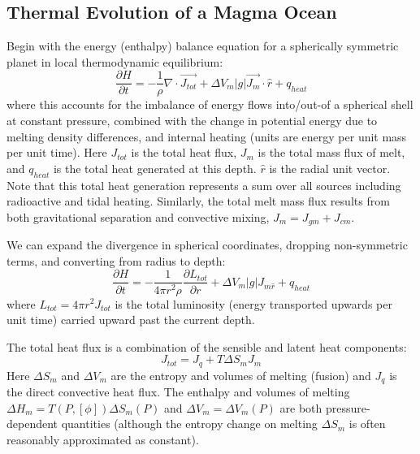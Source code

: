\subsection{Thermal Evolution of a Magma Ocean}
Begin with the energy (enthalpy) balance equation for a spherically symmetric planet in local thermodynamic equilibrium: 
\begin{equation}
  \frac{\partial H}{\partial t} = - \frac{1}{\rho}\nabla \cdot \vec{J_{tot}} + \Delta V_m|g|\vec{J_m} \cdot \hat{r} + q_{heat}
\end{equation}
where this accounts for the imbalance of energy flows into/out-of a spherical shell at constant pressure, combined with the change in potential energy due to melting density differences, and internal heating (units are energy per unit mass per unit time).
Here  $J_{tot}$ is the total heat flux, $J_m$ is the total mass flux of melt, and $q_{heat}$ is the total heat generated at this depth.  $\hat{r}$ is the radial unit vector.
Note that this total heat generation represents a sum over all sources including radioactive and tidal heating.
Similarly, the total melt mass flux results from both gravitational separation and convective mixing, ${J_m = J_{gm} + J_{cm}}$.

We can expand the divergence in spherical coordinates, dropping non-symmetric terms, and converting from radius to depth: 
\begin{equation}
  \frac{\partial H}{\partial t} = - \frac{1}{4\pi r^2 \rho} \frac{\partial L_{tot}}{\partial r} + \Delta V_m|g|J_{m\hat{r}} + q_{heat}
\end{equation}
where $L_{tot} = 4 \pi r^2 J_{tot}$ is the total luminosity (energy transported upwards per unit time) carried upward past the current depth. 


The total heat flux is a combination of the sensible and latent heat components:
\begin{equation}
  J_{tot} = J_q + T\Delta S_m J_m
\end{equation}
Here $\Delta S_m$ and $\Delta V_m$ are the entropy and volumes of melting (fusion) and $J_q$ is the direct convective heat flux.
The enthalpy and volumes of melting ${\Delta H_m = T(P, [\phi])\Delta S_m(P)}$ and ${\Delta V_m = \Delta V_m(P)}$ are both pressure-dependent quantities (although the entropy change on melting $\Delta S_m$ is often reasonably approximated as constant).

